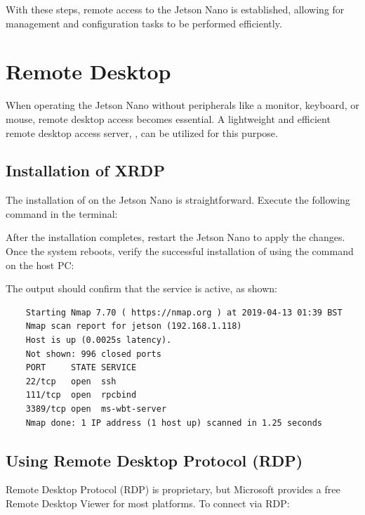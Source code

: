 With these steps, remote access to the Jetson Nano is established, allowing for management and configuration tasks to be performed efficiently.





\section{Remote Desktop}

When operating the Jetson Nano without peripherals like a monitor, keyboard, or mouse, remote desktop access becomes essential. A lightweight and efficient remote desktop access server, , can be utilized for this purpose. 

\subsection{Installation of XRDP}

The installation of  on the Jetson Nano is straightforward. Execute the following command in the terminal:

\medskip


\medskip

After the installation completes, restart the Jetson Nano to apply the changes. Once the system reboots, verify the successful installation of  using the  command on the host PC:

\medskip


\medskip

The output should confirm that the  service is active, as shown:

\begin{verbatim}
	Starting Nmap 7.70 ( https://nmap.org ) at 2019-04-13 01:39 BST
	Nmap scan report for jetson (192.168.1.118)
	Host is up (0.0025s latency).
	Not shown: 996 closed ports
	PORT     STATE SERVICE
	22/tcp   open  ssh
	111/tcp  open  rpcbind
	3389/tcp open  ms-wbt-server
	Nmap done: 1 IP address (1 host up) scanned in 1.25 seconds
\end{verbatim}

\subsection{Using Remote Desktop Protocol (RDP)}

Remote Desktop Protocol (RDP) is proprietary, but Microsoft provides a free Remote Desktop Viewer for most platforms. To connect via RDP:

